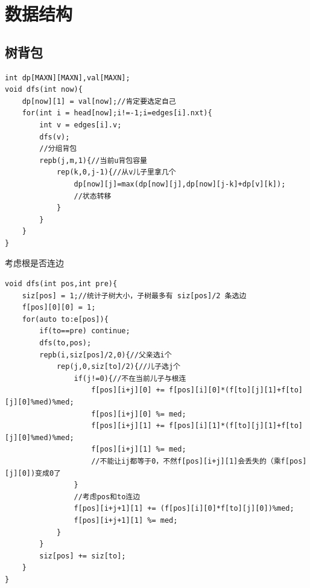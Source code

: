 \documentclass[a4]{ctexart}
\begin{document}
\section{数据结构}

\subsection{树背包}
\begin{lstlisting}
int dp[MAXN][MAXN],val[MAXN];
void dfs(int now){
	dp[now][1] = val[now];//肯定要选定自己
	for(int i = head[now];i!=-1;i=edges[i].nxt){
		int v = edges[i].v;
		dfs(v);
		//分组背包
		repb(j,m,1){//当前u背包容量
			rep(k,0,j-1){//从v儿子里拿几个
				dp[now][j]=max(dp[now][j],dp[now][j-k]+dp[v][k]);
				//状态转移
			}
		}
	}
}
\end{lstlisting}
考虑根是否连边
\begin{lstlisting}
void dfs(int pos,int pre){
    siz[pos] = 1;//统计子树大小，子树最多有 siz[pos]/2 条选边
    f[pos][0][0] = 1;
    for(auto to:e[pos]){
        if(to==pre) continue;
        dfs(to,pos);
        repb(i,siz[pos]/2,0){//父亲选i个
            rep(j,0,siz[to]/2){//儿子选j个
                if(j!=0){//不在当前儿子与根连
                    f[pos][i+j][0] += f[pos][i][0]*(f[to][j][1]+f[to][j][0]%med)%med; 
                    f[pos][i+j][0] %= med;
                    f[pos][i+j][1] += f[pos][i][1]*(f[to][j][1]+f[to][j][0]%med)%med;
                    f[pos][i+j][1] %= med;
                    //不能让ij都等于0，不然f[pos][i+j][1]会丢失的（乘f[pos][j][0])变成0了
                }
                //考虑pos和to连边
                f[pos][i+j+1][1] += (f[pos][i][0]*f[to][j][0])%med;
                f[pos][i+j+1][1] %= med;
            }
        }
        siz[pos] += siz[to];
    }
}
\end{lstlisting}
\end{document}
